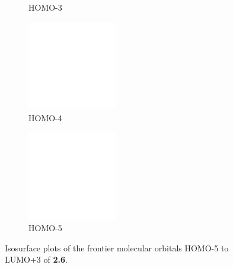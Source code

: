 \begin{figure}[!ht]
\begin{subfigure}[b]{0.31\textwidth}
  \caption{HOMO-3}
 \end{subfigure}
 \begin{subfigure}[b]{0.31\textwidth}
  \includegraphics[clip=true, width=\textwidth, height=39mm, keepaspectratio]{images/mos/6h-4.eps}
  \caption{HOMO-4}
 \end{subfigure}
 \begin{subfigure}[b]{0.31\textwidth}
  \includegraphics[clip=true, width=\textwidth, height=39mm, keepaspectratio]{images/mos/6h-5.eps}
  \caption{HOMO-5}
 \end{subfigure}
\caption[Molecular orbitals HOMO-5 to LUMO+3 of \textbf{2.6}.]{Isosurface plots of the frontier molecular orbitals HOMO-5 to LUMO+3 of \textbf{2.6}.}
\label{fig.mo26}
\end{figure}

